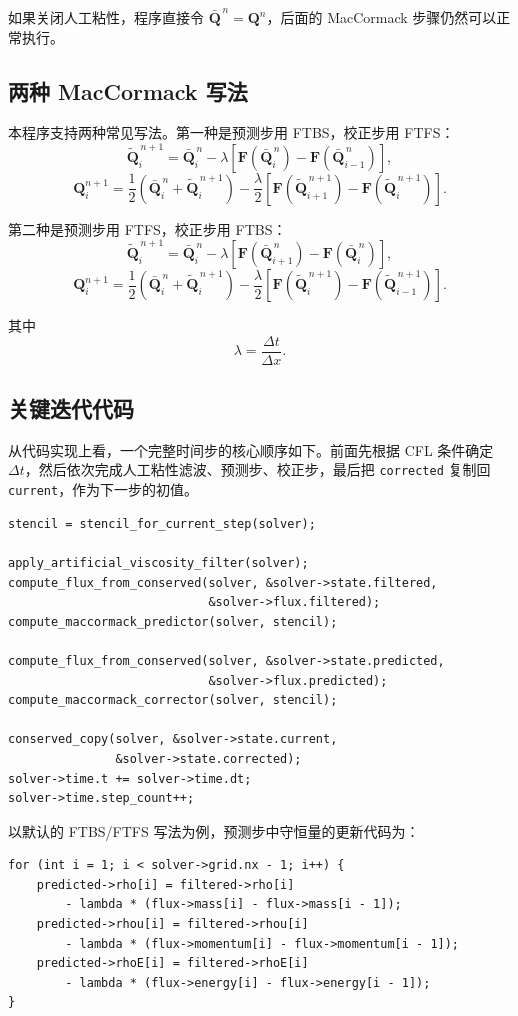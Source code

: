 如果关闭人工粘性，程序直接令
\(\bar{\bm Q}^{\,n}=\bm Q^n\)，后面的 MacCormack 步骤仍然可以正常执行。

\subsection{两种 MacCormack 写法}

本程序支持两种常见写法。第一种是预测步用 FTBS，校正步用 FTFS：
\[
\tilde{\bm Q}^{\,n+1}_i
=\bar{\bm Q}^{\,n}_i
-\lambda\left[
\bm F(\bar{\bm Q}^{\,n}_i)
-\bm F(\bar{\bm Q}^{\,n}_{i-1})
\right],
\]
\[
\bm Q^{n+1}_i
=\frac12\left(
\bar{\bm Q}^{\,n}_i+\tilde{\bm Q}^{\,n+1}_i
\right)
-\frac{\lambda}{2}
\left[
\bm F(\tilde{\bm Q}^{\,n+1}_{i+1})
-\bm F(\tilde{\bm Q}^{\,n+1}_i)
\right].
\]

第二种是预测步用 FTFS，校正步用 FTBS：
\[
\tilde{\bm Q}^{\,n+1}_i
=\bar{\bm Q}^{\,n}_i
-\lambda\left[
\bm F(\bar{\bm Q}^{\,n}_{i+1})
-\bm F(\bar{\bm Q}^{\,n}_i)
\right],
\]
\[
\bm Q^{n+1}_i
=\frac12\left(
\bar{\bm Q}^{\,n}_i+\tilde{\bm Q}^{\,n+1}_i
\right)
-\frac{\lambda}{2}
\left[
\bm F(\tilde{\bm Q}^{\,n+1}_i)
-\bm F(\tilde{\bm Q}^{\,n+1}_{i-1})
\right].
\]

其中
\[
\lambda=\frac{\Delta t}{\Delta x}.
\]

\subsection{关键迭代代码}

从代码实现上看，一个完整时间步的核心顺序如下。前面先根据 CFL 条件确定
\(\Delta t\)，然后依次完成人工粘性滤波、预测步、校正步，最后把
\texttt{corrected} 复制回 \texttt{current}，作为下一步的初值。
\begin{lstlisting}
stencil = stencil_for_current_step(solver);

apply_artificial_viscosity_filter(solver);
compute_flux_from_conserved(solver, &solver->state.filtered,
                            &solver->flux.filtered);
compute_maccormack_predictor(solver, stencil);

compute_flux_from_conserved(solver, &solver->state.predicted,
                            &solver->flux.predicted);
compute_maccormack_corrector(solver, stencil);

conserved_copy(solver, &solver->state.current,
               &solver->state.corrected);
solver->time.t += solver->time.dt;
solver->time.step_count++;
\end{lstlisting}

以默认的 FTBS/FTFS 写法为例，预测步中守恒量的更新代码为：
\begin{lstlisting}
for (int i = 1; i < solver->grid.nx - 1; i++) {
    predicted->rho[i] = filtered->rho[i]
        - lambda * (flux->mass[i] - flux->mass[i - 1]);
    predicted->rhou[i] = filtered->rhou[i]
        - lambda * (flux->momentum[i] - flux->momentum[i - 1]);
    predicted->rhoE[i] = filtered->rhoE[i]
        - lambda * (flux->energy[i] - flux->energy[i - 1]);
}
\end{lstlisting}


